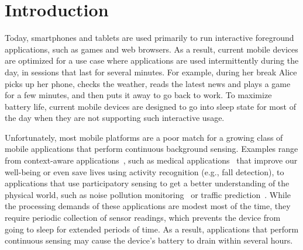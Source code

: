 
\section{\label{sec:Introduction}Introduction}

Today, smartphones and tablets are used primarily to run interactive
foreground applications, such as games and web browsers.  As a result,
current mobile devices are optimized for a use case where applications
are used intermittently during the day, in sessions that last for
several minutes.  For example, during her break Alice picks up
her phone, checks the weather, reads the latest news and plays a
game for a few minutes, and then puts it away to go back to work.  To
maximize battery life, current mobile devices are designed to go
into sleep state for most of the day when they are not supporting such
interactive usage.

Unfortunately, most mobile platforms are a poor match for a growing
class of mobile applications that perform continuous background
sensing.  Examples range from context-aware applications~\cite{baldauf2007survey,hong2009context}, such as
medical applications~\cite{hameed2003application,preuveneers2008mobile,tsai2007usability} that improve our
well-being or even save lives using activity recognition (e.g., fall
detection), to applications that use participatory sensing to get a
better understanding of the physical world, such as noise pollution
monitoring~\cite{maisonneuve2009citizen,maisonneuve2009noisetube} or traffic prediction~\cite{hull2006cartel}.  While the processing demands of
these applications are modest most of the time, they require periodic
collection of sensor readings, which prevents the device from going to
sleep for extended periods of time.  As a result, applications that
perform continuous sensing may cause the device's battery to drain
within several hours.

